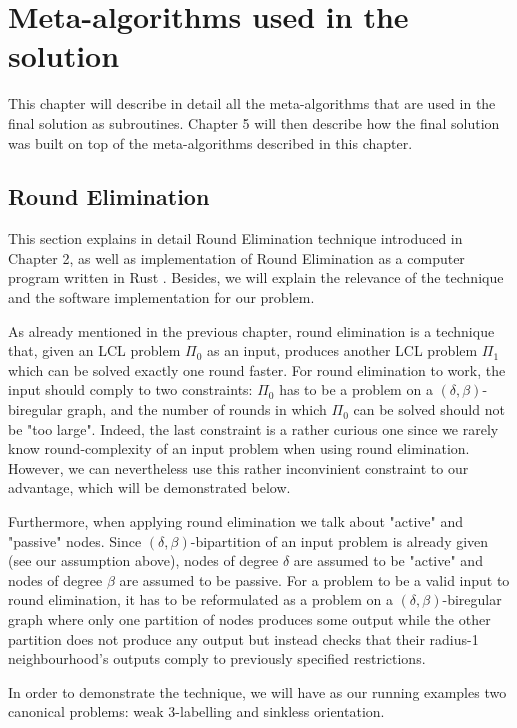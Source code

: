 \chapter{Meta-algorithms used in the solution}
\label{chapter:environment}

This chapter will describe in detail all the meta-algorithms that are
used in the final solution as subroutines.
Chapter 5 will then
describe how the final solution was built on top of the meta-algorithms
described in this chapter.

\section{Round Elimination}

This section explains in detail Round Elimination
technique introduced in Chapter 2, as well as
implementation of Round Elimination as a computer
program written in Rust \cite{Brandt2019, Olivetti2020}.
Besides, we will explain the relevance of the technique
and the software implementation for our problem.

As already mentioned in the previous chapter, round elimination
is a technique that, given an LCL problem $\Pi_0$ as an input, produces
another LCL problem $\Pi_1$ which can be solved exactly one round
faster. For round elimination to work, the input should comply
to two constraints: $\Pi_0$ has to be a problem on a $(\delta, \beta)$-
biregular graph, and the number of rounds in which $\Pi_0$ can be solved
should not be "too large". Indeed, the last constraint is a rather curious one
since we rarely know round-complexity of an input problem when using
round elimination. However, we can nevertheless use this rather inconvinient constraint
to our advantage, which will be demonstrated below.

Furthermore, when applying round elimination we talk about "active" and
"passive" nodes. Since $(\delta, \beta)$-bipartition of an input problem is
already given (see our assumption above), nodes of degree $\delta$ are assumed
to be "active" and nodes of degree $\beta$ are assumed to be passive. For a problem
to be a valid input to round elimination, it has to be reformulated as a problem on
a $(\delta, \beta)$-biregular graph where only one partition of nodes produces
some output while the other partition does not produce any output but instead
checks that their radius-1 neighbourhood's outputs comply to previously
specified restrictions.

In order to demonstrate the technique, we will have as our running
examples two canonical problems: weak 3-labelling and sinkless orientation.

